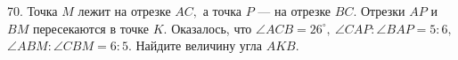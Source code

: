 70. Точка $M$ лежит на отрезке $AC,$ а точка $P$ --- на отрезке $BC.$ Отрезки $AP$ и $BM$ пересекаются в точке $K.$ Оказалось, что $\angle ACB=26^\circ,\ \angle CAP : \angle BAP=5:6,$ $\angle ABM: \angle CBM=6:5.$ Найдите величину угла $AKB.$\\
